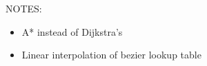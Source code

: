 NOTES:
\begin{itemize}
    \item A* instead of Dijkstra's
    \item Linear interpolation of bezier lookup table
\end{itemize}
